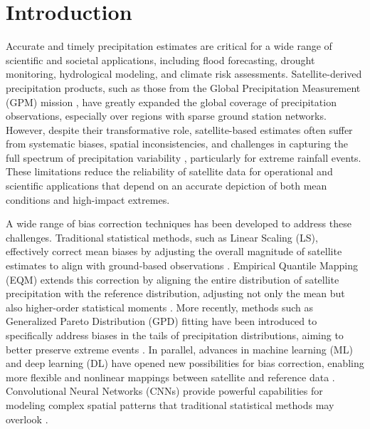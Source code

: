 \documentclass[11pt,a4paper]{article}
\begin{document}
\begin{abstract}
\noindent\textbf{Keywords:} Bias Correction, Satellite Precipitation, IMERG, Daily Precipitation, Extreme Events, Deep Learning, Quantile Mapping, Generalized Pareto Distribution, Quality Assessment, Indonesia
\end{abstract}

\newpage


\section{Introduction}\label{introduction}

Accurate and timely precipitation estimates are critical for a wide
range of scientific and societal applications, including flood
forecasting, drought monitoring, hydrological modeling, and climate risk
assessments. Satellite-derived precipitation products, such as those
from the Global Precipitation Measurement (GPM) mission \cite{ref1,ref2}, have
greatly expanded the global coverage of precipitation observations,
especially over regions with sparse ground station networks. However,
despite their transformative role, satellite-based estimates often
suffer from systematic biases, spatial inconsistencies, and challenges
in capturing the full spectrum of precipitation variability \cite{ref3},
particularly for extreme rainfall events. These limitations reduce the
reliability of satellite data for operational and scientific
applications that depend on an accurate depiction of both mean
conditions and high-impact extremes.

A wide range of bias correction techniques has been developed to address
these challenges. Traditional statistical methods, such as Linear
Scaling (LS), effectively correct mean biases by adjusting the overall
magnitude of satellite estimates to align with ground-based observations
\cite{ref4}. Empirical Quantile Mapping (EQM) extends this correction by
aligning the entire distribution of satellite precipitation with the
reference distribution, adjusting not only the mean but also
higher-order statistical moments \cite{ref5,ref6}. More recently, methods such
as Generalized Pareto Distribution (GPD) fitting have been introduced to
specifically address biases in the tails of precipitation distributions,
aiming to better preserve extreme events \cite{ref7}. In parallel, advances
in machine learning (ML) and deep learning (DL) have opened new
possibilities for bias correction, enabling more flexible and nonlinear
mappings between satellite and reference data \cite{ref8}. Convolutional
Neural Networks (CNNs) provide powerful capabilities for modeling
complex spatial patterns that traditional statistical methods may
overlook \cite{ref9,ref10}.
\end{document}
